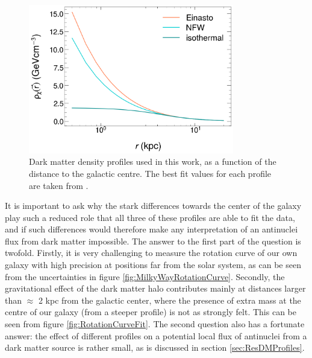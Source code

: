 \begin{figure}
    \centering
    \includegraphics[width=0.8\textwidth]{figures/DMProfiles_distributions_log.png}
    \caption{Dark matter density profiles used in this work, as a function of the distance to the galactic centre. The best fit values for each profile are taken from \cite{Ibarra:2012cc}.}
    \label{fig:DMProfiles}
\end{figure}

It is important to ask why the stark differences towards the center of the galaxy play such a reduced role that all three of these profiles are able to fit the data, and if such differences would therefore make any interpretation of an antinuclei flux from dark matter impossible. The answer to the first part of the question is twofold. Firstly, it is very challenging to measure the rotation curve of our own galaxy with high precision at positions far from the solar system, as can be seen from the uncertainties in figure \ref{fig:MilkyWayRotationCurve}. Secondly, the gravitational effect of the dark matter halo contributes mainly at distances larger than $\approx$ 2 kpc from the galactic center, where the presence of extra mass at the centre of our galaxy (from a steeper profile) is not as strongly felt. This can be seen from figure \ref{fig:RotationCurveFit}. The second question also has a fortunate answer: the effect of different profiles on a potential local flux of antinuclei from a dark matter source is rather small, as is discussed in section \ref{sec:ResDMProfiles}. 


